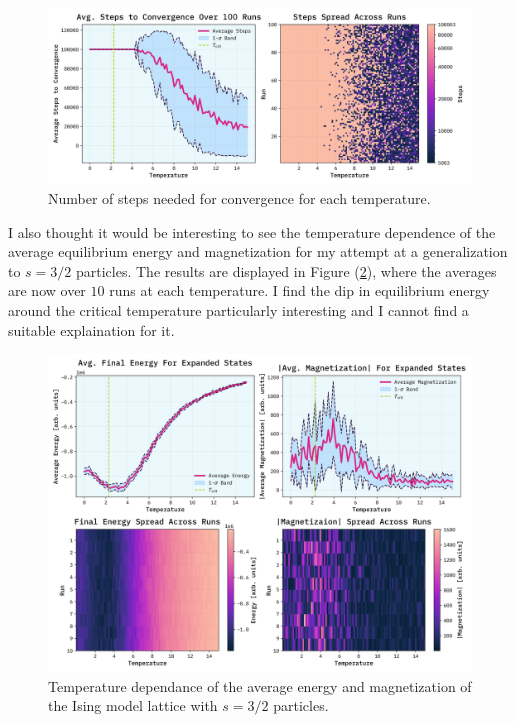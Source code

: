 \documentclass[10pt, titlepage, a4paper]{article}
\begin{document}
\begin{figure}[H]
    \centering
    \includegraphics[width=.95\textwidth]{../IsingModel/Images/steps-vs-T.png}
    \caption{Number of steps needed for convergence for each temperature.}
    \label{fig:ising-steps}
\end{figure}

I also thought it would be interesting to see the temperature dependence of the average equilibrium energy and magnetization for 
my attempt at a generalization to $s=3/2$ particles. The results are displayed in Figure (\ref{fig:ising-3/2-energy-magnetization}), where the 
averages are now over $10$ runs at each temperature. I find the dip in equilibrium energy around the critical temperature particularly 
interesting and I cannot find a suitable explaination for it.

\begin{figure}[H]
    \centering
    \includegraphics[width=.95\textwidth]{../IsingModel/Images/avgE-avgS-vs-T-expanded.png}
    \caption{Temperature dependance of the average energy and magnetization of the Ising model lattice with $s=3/2$ particles.}
    \label{fig:ising-3/2-energy-magnetization}
\end{figure}
\end{document}
